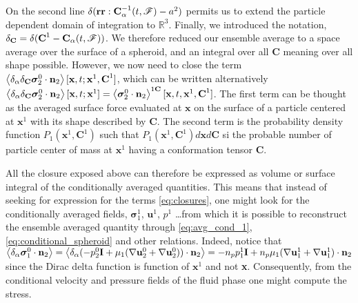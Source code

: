 On the second line $\delta(\textbf{rr}: \textbf{C}_\alpha^{-1}(t,\mathscr{F}) -a^2)$ permits us to extend the particle dependent domain of integration to $\mathbb{R}^3$. 
Finally, we introduced the notation, $\delta_\textbf{C} = \delta(\textbf{C}^1 - \textbf{C}_\alpha(t,\mathscr{F}))$. 
We therefore reduced our ensemble average to a space average over the surface of a spheroid, and an integral over all $\textbf{C}$ meaning over all shape possible.
However, we now need to close the term $\left<\delta_\alpha \delta_\textbf{C} \bm\sigma_2^0\cdot \textbf{n}_2\right>
[\textbf{x},t;\textbf{x}^1,\textbf{C}^1]$, which can be written alternatively $\left<\delta_\alpha \delta_\textbf{C} \bm\sigma_2^0\cdot \textbf{n}_2\right>
[\textbf{x},t;\textbf{x}^1] = \left<\bm\sigma_2^0\cdot \textbf{n}_2\right>^{1\textbf{C}}
[\textbf{x},t,\textbf{x}^1,\textbf{C}^1]$.
The first term can be thought as the averaged surface force evaluated at $\textbf{x}$ on the surface of a particle centered at $\textbf{x}^1$ with its shape described by $\textbf{C}$.
The second term is the probability density function $P_1(\textbf{x}^1,\textbf{C}^1)$ such that $P_1(\textbf{x}^1,\textbf{C}^1)d\textbf{x}d\textbf{C}$ si the probable number of particle center of mass at $\textbf{x}^1$ having a conformation tensor $\textbf{C}$. 

All the closure exposed above can therefore be expressed as volume or surface integral of the conditionally averaged quantities.
This means that instead of seeking for expression for the terms \ref{eq:closures}, one might look for the conditionally averaged fields, $\bm\sigma^1_1$, $\textbf{u}^1$, $p^1$ \ldots from which it is possible to reconstruct the ensemble averaged quantity through \ref{eq:avg_cond_1},\ref{eq:conditional_spheroid} and other relations. 
Indeed, notice that $\left<\delta_\alpha \bm\sigma_1^0\cdot \textbf{n}_2\right>
= \left<\delta_\alpha  (-p_2^0 \textbf{I} + \mu_1 (\mathbf{\nabla} \textbf{u}_2^0+\mathbf{\nabla} \textbf{u}_2^0))\cdot \textbf{n}_2\right>
= - n_p p_1^1 \textbf{I} + n_p \mu_1 (\mathbf{\nabla} \textbf{u}_1^1 + \mathbf{\nabla} \textbf{u}_1^1)\cdot \textbf{n}_2$ since the Dirac delta function is function of $\textbf{x}^1$ and not \textbf{x}. 
Consequently, from the conditional velocity and pressure fields of the fluid phase one might compute the stress. 

